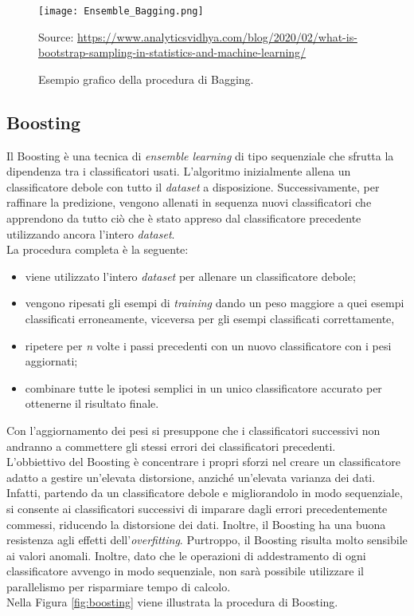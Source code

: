 \begin{figure}[h]
	\begin{center}
		\texttt{[image: Ensemble\_Bagging.png]}
		\caption{Esempio grafico della procedura di Bagging.
		} 
		Source: \url{https://www.analyticsvidhya.com/blog/2020/02/what-is-bootstrap-sampling-in-statistics-and-machine-learning/}\label{fig:bagging}
	\end{center}
\end{figure}

\subsection{Boosting}
Il Boosting \autocite{freund1996experiments} è una tecnica di \emph{ensemble learning} di tipo sequenziale che sfrutta la dipendenza tra i classificatori usati. L'algoritmo inizialmente allena un classificatore debole con tutto il \emph{dataset} a disposizione. Successivamente, per raffinare la predizione, vengono allenati in sequenza nuovi classificatori che apprendono da tutto ciò che è stato appreso dal classificatore precedente utilizzando ancora l'intero \emph{dataset}.\\
La procedura completa è la seguente:
\begin{itemize}
	\item viene utilizzato l'intero \emph{dataset} per allenare un classificatore debole;
	\item vengono ripesati gli esempi di \emph{training} dando un peso maggiore a quei esempi classificati erroneamente, viceversa per gli esempi classificati correttamente,
	\item ripetere per \emph{n} volte i passi precedenti con un nuovo classificatore con i pesi aggiornati;
	\item combinare tutte le ipotesi semplici in un unico classificatore accurato per ottenerne il risultato finale.
\end{itemize}
Con l'aggiornamento dei pesi si presuppone che i classificatori successivi non andranno a commettere gli stessi errori dei classificatori precedenti.\\
L'obbiettivo del Boosting è concentrare i propri sforzi nel creare un classificatore adatto a gestire un'elevata distorsione, anziché un'elevata varianza dei dati. Infatti, partendo da un classificatore debole e migliorandolo in modo sequenziale, si consente ai classificatori successivi di imparare dagli errori precedentemente commessi, riducendo la distorsione dei dati. Inoltre, il Boosting ha una buona resistenza agli effetti dell'\emph{overfitting}.
Purtroppo, il Boosting risulta molto sensibile ai valori anomali. Inoltre, dato che le operazioni di addestramento di ogni classificatore avvengo in modo sequenziale, non sarà possibile utilizzare il parallelismo per risparmiare tempo di calcolo.\\
Nella Figura \ref{fig:boosting} viene illustrata la procedura di Boosting.

